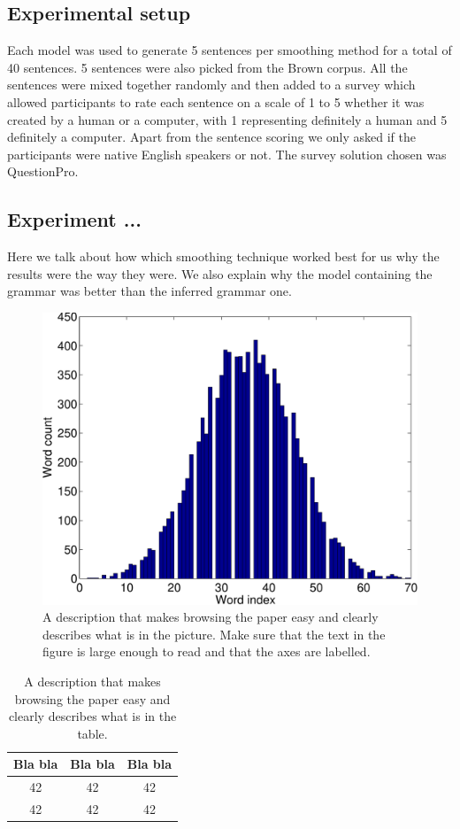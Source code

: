 \documentclass[a4paper,12pt]{article}
\begin{document}
\subsection{Experimental setup}
Each model was used to generate 5 sentences per smoothing method for a total of 40 sentences. 5 sentences were also picked from the Brown corpus. All the sentences were mixed together randomly and then added to a survey which allowed participants to rate each sentence on a scale of 1 to 5 whether it was created by a human or a computer, with 1 representing definitely a human and 5 definitely a computer. Apart from the sentence scoring we only asked if the participants were native English speakers or not. The survey solution chosen was QuestionPro.

\subsection{Experiment ...}

Here we talk about how which smoothing technique worked best for us why the results were the way they were. We also explain why the model containing the grammar was better than the inferred grammar one. 

\begin{figure}
\centering
\includegraphics[width=0.8\linewidth]{histogram}
\caption{A description that makes browsing the paper easy and clearly
describes what is in the picture. Make sure that the text in the figure
is large enough to read and that the axes are labelled.}
\label{fig:histogram}
\end{figure}



\begin{table}
\begin{center}
\begin{tabular}{|c|c|c|}
\hline
Bla bla & Bla bla & Bla bla \\ \hline
42 & 42 & 42 \\ \hline
42 & 42 & 42 \\ \hline
\end{tabular}
\caption{A description that makes browsing the paper easy and clearly
describes what is in the table.}
\label{tab:results}
\end{center}
\end{table}
\end{document}

